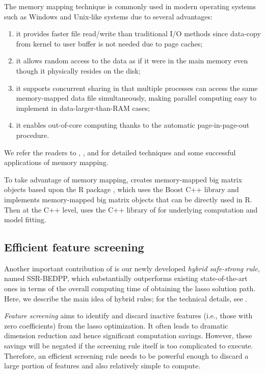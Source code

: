 The memory mapping technique is commonly used in modern operating systems such as Windows and Unix-like systems due to several advantages:
\begin{enumerate}[(1)]
\item it provides faster file read/write than traditional I/O methods since data-copy from kernel to user buffer is not needed due to page caches;
\item it allows random access to the data as if it were in the main memory even though it physically resides on the disk;
\item it supports concurrent sharing in that multiple processes can access the same memory-mapped data file simultaneously, making parallel computing easy to implement in data-larger-than-RAM cases;
\item it enables out-of-core computing thanks to the automatic page-in-page-out procedure.
\end{enumerate}
We refer the readers to \cite{rao2010critical}, \cite{lin2014mmap}, and \cite{bovet2005understanding} for detailed techniques and some successful applications of memory mapping.

To take advantage of memory mapping,  creates memory-mapped big matrix objects based upon the R package  \citep{kane2013scalable}, which uses the Boost C++ library and implements memory-mapped big matrix objects that can be directly used in R. Then at the C++ level,  uses the C++ library of  for underlying computation and model fitting.

\subsection{Efficient feature screening}

Another important contribution of  is our newly developed \textit{hybrid safe-strong rule}, named SSR-BEDPP, which substantially outperforms existing state-of-the-art ones in terms of the overall computing time of obtaining the lasso solution path.  Here, we describe the main idea of hybrid rules; for the technical details, see \citet{ZengRules}.

\textit{Feature screening} aims to identify and discard inactive features (i.e., those with zero coefficients) from the lasso optimization. It often leads to dramatic dimension reduction and hence significant computation savings. However, these savings will be negated if the screening rule itself is too complicated to execute. Therefore, an efficient screening rule needs to be powerful enough to discard a large portion of features and also relatively simple to compute.


